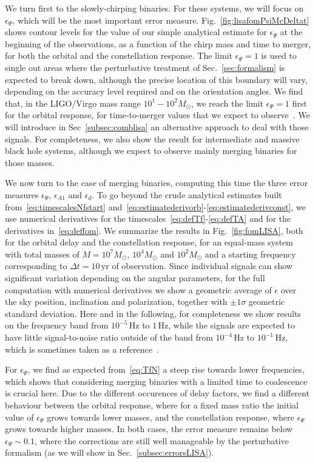 \documentclass[aps,showpacs,twocolumn,
prd,superscriptaddress,nofootinbib]{revtex4-1}
\newcommand{\Hz}{\,\mathrm{Hz}}
\newcommand{\yr}{\,\mathrm{yr}}
\newcommand{\Msol}{M_{\odot}}
\begin{document}
We turn first to the slowly-chirping binaries. For these systems, we will focus on $\epsilon_{\Psi}$, which will be the most important error measure. Fig.~\ref{fig:lisafomPsiMcDeltat} shows contour levels for the value of our simple analytical estimate for $\epsilon_{\Psi}$ at the beginning of the observations, as a function of the chirp mass and time to merger, for both the orbital and the constellation response. The limit $\epsilon_{\Psi} = 1$ is used to single out areas where the perturbative treatment of Sec.~\ref{sec:formalism} is expected to break down, although the precise location of this boundary will vary, depending on the accuracy level required and on the orientation angles. We find that, in the LIGO/Virgo mass range $10^{1}-10^{2} \Msol$, we reach the limit $\epsilon_{\Psi}=1$ first for the orbital response, for time-to-merger values that we expect to observe~\cite{Sesana16}. We will introduce in Sec~\ref{subsec:comblisa} an alternative approach to deal with those signals. For completeness, we also show the result for intermediate and massive black hole systems, although we expect to observe mainly merging binaries for those masses. 

We now turn to the case of merging binaries, computing this time the three error measures $\epsilon_{\Psi}$, $\epsilon_{A1}$ and $\epsilon_{d}$. To go beyond the crude analytical estimates built from~\eqref{eq:timescalesNfstart} and~\eqref{eq:estimatederivorb}-\eqref{eq:estimatederivconst}, we use numerical derivatives for the timescales~\eqref{eq:defTf}-\eqref{eq:defTA} and for the derivatives in~\eqref{eq:deffom}. We summarize the results in Fig.~\ref{fig:fomLISA}, both for the orbital delay and the constellation response, for an equal-mass system with total masses of $M=10^{7} \Msol$, $10^{4} \Msol$ and $10^{2} \Msol$ and a starting frequency corresponding to $\Delta t =10 \yr$ of observation. Since individual signals can show significant variation depending on the angular parameters, for the full computation with numerical derivatives we show a geometric average of $\epsilon$ over the sky position, inclination and polarization, together with $\pm 1\sigma$ geometric standard deviation. Here and in the following, for completeness we show results on the frequency band from $10^{-5}\Hz$ to $1\Hz$, while the signals are expected to have little signal-to-noise ratio outside of the band from $10^{-4}\Hz$ to $10^{-1}\Hz$, which is sometimes taken as a reference~\cite{LISA17}.

For $\epsilon_{\Psi}$, we find as expected from~\eqref{eq:TfN} a steep rise towards lower frequencies, which shows that considering merging binaries with a limited time to coalescence is crucial here. Due to the different occurences of delay factors, we find a different behaviour between the orbital response, where for a fixed mass ratio the initial value of $\epsilon_{\Psi}$ grows towards lower masses, and the constellation response, where $\epsilon_{\Psi}$ grows towards higher masses. In both cases, the error measure remains below $\epsilon_{\Psi} \sim 0.1$, where the corrections are still well manageable by the perturbative formalism (as we will show in Sec.~\ref{subsec:errorsLISA}).
\end{document}
